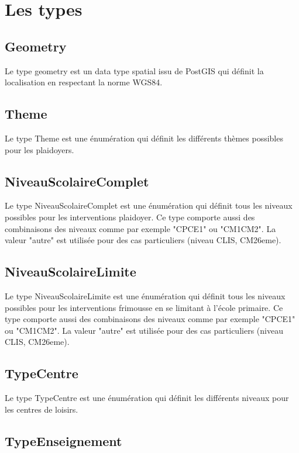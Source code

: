 \documentclass[asi, sansVersion]{picInsa}
\begin{document}
\section{Les types}

\subsection*{Geometry}

Le type geometry est un data type spatial issu de PostGIS qui définit la localisation en respectant la norme WGS84.

\subsection*{Theme}

Le type Theme est une énumération qui définit les différents thèmes possibles pour les plaidoyers.

\subsection*{NiveauScolaireComplet}

Le type NiveauScolaireComplet est une énumération qui définit tous les niveaux possibles pour les interventions plaidoyer. Ce type comporte aussi des combinaisons des niveaux comme par exemple "CPCE1" ou "CM1CM2". La valeur "autre" est utilisée pour des cas particuliers (niveau CLIS, CM26eme).

\subsection*{NiveauScolaireLimite}

Le type NiveauScolaireLimite est une énumération qui définit tous les niveaux possibles pour les interventions frimousse en se limitant à l'école primaire. Ce type comporte aussi des combinaisons des niveaux comme par exemple "CPCE1" ou "CM1CM2". La valeur "autre" est utilisée pour des cas particuliers (niveau CLIS, CM26eme).

\subsection*{TypeCentre}

Le type TypeCentre est une énumération qui définit les différents niveaux pour les centres de loisirs.

\subsection*{TypeEnseignement}
\end{document}
